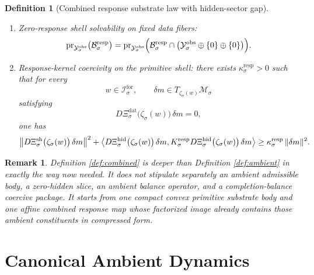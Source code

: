 \documentclass[11pt]{article}
\newcommand{\ForSpace}[1]{\mathcal I_{#1}^{\mathrm{for}}}
\newcommand{\Reduction}[1]{\mathcal R_{#1}}
\newcommand{\CurrentCarrier}[1]{\mathfrak C_{#1}^{\mathrm{cur}}}
\newcommand{\EqCarrier}[1]{\mathfrak C_{#1}^{\mathrm{eq}}}
\newcommand{\DataSpace}[1]{\mathcal Y_{#1}^{\mathrm{obs}}}
\newcommand{\ProtoSpace}[1]{\mathcal M_{#1}}
\newcommand{\ResponseData}[1]{\Xi_{#1}^{\mathrm{dat}}}
\newcommand{\ResponseShell}[1]{\Xi_{#1}^{\mathrm{sh}}}
\newcommand{\ResponseHidden}[1]{\Xi_{#1}^{\mathrm{hid}}}
\newcommand{\ResponseImage}[1]{\mathcal B_{#1}^{\mathrm{resp}}}
\newcommand{\RespHiddenOperator}[1]{K_{#1}^{\mathrm{resp}}}
\newcommand{\ProtoEmbed}[1]{\zeta_{#1}}
\newtheorem{definition}{Definition}
\newtheorem{remark}{Remark}
\begin{document}
\begin{definition}[Combined response substrate law with hidden-sector gap]
\begin{enumerate}
\begin{equation}
    =
    \bigl(
    \jmath_{\sigma}(\Reduction{\sigma}(w)),
    \CurrentCarrier{\sigma}(w),
    \EqCarrier{\sigma}(w)
    \bigr)
    \label{eq:combinedcompat}
    \end{equation}
    for every \(w\in\ForSpace{\sigma}\).
    \item Zero-response shell solvability on fixed data fibers:
    \begin{equation}
    \operatorname{pr}_{\DataSpace{\sigma}}\bigl(\ResponseImage{\sigma}\bigr)
    =
    \operatorname{pr}_{\DataSpace{\sigma}}
    \Bigl(
    \ResponseImage{\sigma}\cap
    \bigl(
    \DataSpace{\sigma}\oplus\{0\}\oplus\{0\}
    \bigr)
    \Bigr).
    \label{eq:combinedsolvability}
    \end{equation}
    \item Response-kernel coercivity on the primitive shell: there exists \(\kappa_{\sigma}^{\mathrm{resp}}>0\) such that for every
    \[
    w\in\ForSpace{\sigma},
    \qquad
    \delta m\in T_{\ProtoEmbed{\sigma}(w)}\ProtoSpace{\sigma}
    \]
    satisfying
    \[
    D\ResponseData{\sigma}\bigl(\ProtoEmbed{\sigma}(w)\bigr)\,\delta m=0,
    \]
    one has
    \begin{equation}
    \bigl\|
    D\ResponseShell{\sigma}\bigl(\ProtoEmbed{\sigma}(w)\bigr)\,\delta m
    \bigr\|^{2}
    +
    \ev{
    D\ResponseHidden{\sigma}\bigl(\ProtoEmbed{\sigma}(w)\bigr)\,\delta m,
    \RespHiddenOperator{\sigma}
    D\ResponseHidden{\sigma}\bigl(\ProtoEmbed{\sigma}(w)\bigr)\,\delta m
    }
    \ge
    \kappa_{\sigma}^{\mathrm{resp}}\,
    \|\delta m\|^{2}.
    \label{eq:combinedcoercive}
    \end{equation}
\end{enumerate}
\end{definition}

\begin{remark}
Definition \ref{def:combined} is deeper than Definition \ref{def:ambient} in exactly the way now needed. It does not stipulate separately an ambient admissible body, a zero-hidden slice, an ambient balance operator, and a completion-balance coercive package. It starts from one compact convex primitive substrate body and one affine combined response map whose factorized image already contains those ambient constituents in compressed form.
\end{remark}

\section{Canonical Ambient Dynamics}
\end{document}
